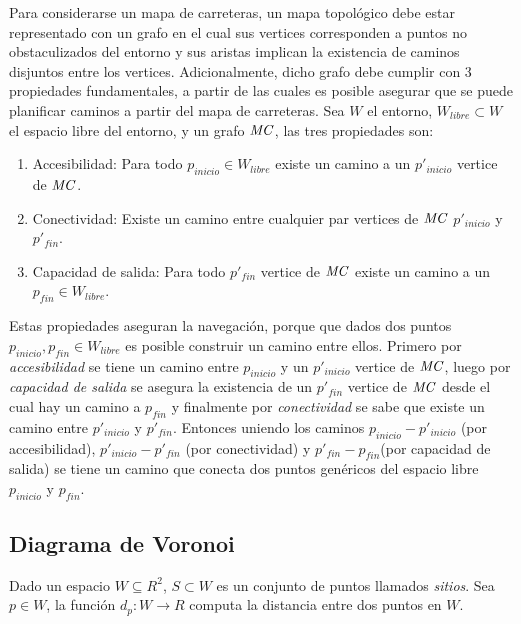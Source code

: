 Para considerarse un mapa de carreteras, un mapa topológico debe estar representado con un grafo en el cual sus vertices corresponden a puntos no obstaculizados del entorno y sus aristas implican la existencia de caminos disjuntos entre los vertices. Adicionalmente, dicho grafo debe cumplir con 3 propiedades fundamentales, a partir de las cuales es posible asegurar que se puede planificar caminos a partir del mapa de carreteras. Sea $W$ el entorno, $W_{libre} \subset W$ el espacio libre del entorno, y  un grafo $\mathit{MC}$, las tres propiedades son:

\begin{enumerate}
  \item Accesibilidad: Para todo $p_{inicio} \in W_{libre}$ existe un camino a un $p'_{inicio}$ vertice de $\mathit{MC}$.
  \item Conectividad: Existe un camino entre cualquier par vertices de $\mathit{MC}$ $p'_{inicio}$ y $p'_{fin}$.
  \item Capacidad de salida: Para todo $p'_{fin}$ vertice de $\mathit{MC}$ existe un camino a un $p_{fin} \in W_{libre}$.
\end{enumerate}

Estas propiedades aseguran la navegación, porque que dados dos puntos $p_{inicio},p_{fin}\in W_{libre}$ es posible construir un camino entre ellos. Primero por \emph{accesibilidad} se tiene un camino entre $p_{inicio}$ y un $p'_{inicio}$ vertice de $\mathit{MC}$, luego por \emph{capacidad de salida} se asegura la existencia de un  $p'_{fin}$ vertice de $\mathit{MC}$ desde el cual hay un camino a $p_{fin}$ y finalmente por \emph{conectividad} se sabe que existe un camino entre $p'_{inicio}$ y $p'_{fin}$. Entonces uniendo los caminos $p_{inicio} - p'_{inicio}$ (por accesibilidad), $p'_{inicio} - p'_{fin}$ (por conectividad) y $p'_{fin} - p_{fin}$(por capacidad de salida) se tiene un camino que conecta dos puntos genéricos del espacio libre $p_{inicio}$ y $p_{fin}$.

\subsection{Diagrama de Voronoi}
Dado un espacio $W \subseteq R^2$, $S \subset W$ es un conjunto de puntos llamados \emph{sitios}. Sea $p\in W$, la función $d_p : W \rightarrow R$ computa la distancia entre dos puntos en $W$. 


